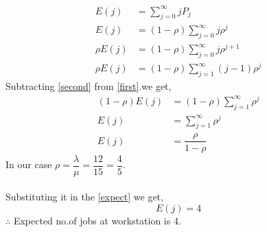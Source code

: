 \documentclass[journal,12pt,twocolumn]{IEEEtran}
\begin{document}
\begin{align}
    E(j)&=\sum_{j=0}^{\infty}jP_j\\
    E(j)&=(1-\rho)\sum_{j=0}^{\infty}j\rho^j\label{first}\\
    \rho E(j)&=(1-\rho)\sum_{j=0}^{\infty}j\rho^{j+1}\\
    \rho E(j)&=(1-\rho)\sum_{j=1}^{\infty}(j-1)\rho^{j}\label{second}
\end{align}
Subtracting \eqref{second} from \eqref{first}.we get,
\begin{align}
    (1-\rho)E(j)&=(1-\rho)\sum_{j=1}^{\infty}\rho^j\\
    E(j)&=\sum_{j=1}^{\infty}\rho^j\\
    E(j)&=\dfrac{\rho}{1-\rho}\label{expect}
\end{align}
In our case $\rho=\dfrac{\lambda}{\mu}=\dfrac{12}{15}=\dfrac{4}{5}$.\\\\Substituting it in the \eqref{expect} we get,\\
\begin{equation}
    E(j)=4
\end{equation}
$\therefore$ Expected no.of jobs at workstation is 4.
\end{document}
